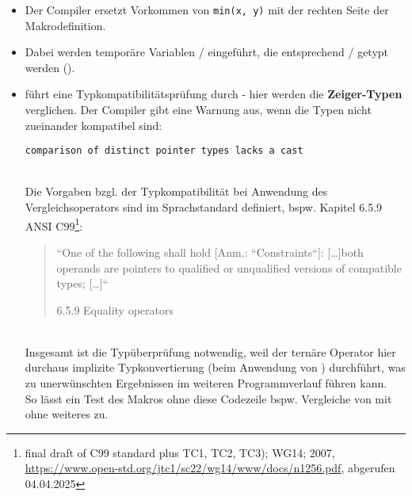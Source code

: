 \begin{itemize}
    \itemsep0.5em
    \item Der Compiler ersetzt Vorkommen von \texttt{min(x, y)} mit der rechten Seite der Makrodefinition.
    \item Dabei werden temporäre Variablen  /  eingeführt, die entsprechend  /  getypt werden ().
    \item {} führt eine Typkompatibilitätsprüfung durch - hier werden die \textbf{Zeiger-Typen} verglichen.
    Der Compiler gibt eine Warnung aus, wenn die Typen nicht zueinander kompatibel sind:
    \begin{center}\texttt{comparison of distinct pointer types lacks a cast}\end{center}\\
    Die Vorgaben bzgl. der Typkompatibilität bei Anwendung des Vergleichsoperators sind im Sprachstandard definiert, bspw. Kapitel 6.5.9 ANSI C99\footnote{
        final draft of C99 standard plus TC1, TC2, TC3); WG14; 2007, \url{https://www.open-std.org/jtc1/sc22/wg14/www/docs/n1256.pdf}, abgerufen 04.04.2025
    }: \blockquote[{6.5.9 Equality operators}]{
    ``One of the following shall hold [Anm.: ``Constraints``]: [\ldots]both operands are pointers to qualified or unqualified versions of compatible types; [\ldots]``
    }.\\
    Insgesamt ist die Typüberprüfung notwendig, weil der ternäre Operator hier durchaus implizite Typkonvertierung (beim Anwendung von \code{<}) durchführt, was zu unerwünschten Ergebnissen im weiteren Programmverlauf führen kann.\\
    So lässt ein Test des Makros ohne diese Codezeile bspw. Vergleiche von  mit  ohne weiteres zu.
\end{itemize}